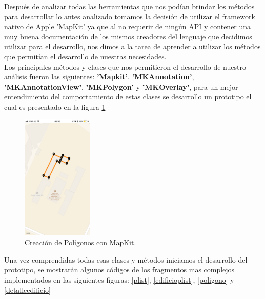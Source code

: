  Después de analizar todas las herramientas que nos podían brindar los métodos para desarrollar lo antes analizado tomamos la decisión de utilizar el framework nativo de Apple 'MapKit' ya que al no requerir de ningún API y contener una muy buena documentación de los mismos creadores del lenguaje que decidimos utilizar para el desarrollo, nos dimos a la tarea de aprender a utilizar los métodos que permitían el desarrollo de nuestras necesidades.\\
 
 Los principales  métodos y clases que nos permitieron el desarrollo de nuestro análisis fueron las siguientes: \textbf{'Mapkit'}, \textbf{'MKAnnotation'}, \textbf{'MKAnnotationView'}, \textbf{'MKPolygon'} y \textbf{'MKOverlay'}, para un mejor entendimiento del comportamiento de estas clases se desarrollo un prototipo el cual es presentado en la figura \ref{mapkit}\\
 \begin{figure}[h!]
 	\begin{center}
 		\includegraphics[width=0.3\textwidth]{images/maqueta/mapkit.png}
 		\caption{Creación de Polígonos con MapKit.}
 		\label{mapkit}
 	\end{center}
 \end{figure}

 Una vez comprendidas todas esas clases y métodos iniciamos el desarrollo del prototipo, se mostrarán algunos códigos de los fragmentos mas complejos implementados en las siguientes figuras: \ref{plist}, \ref{edificioplist}, \ref{poligono} y \ref{detalleedificio}\\
 
